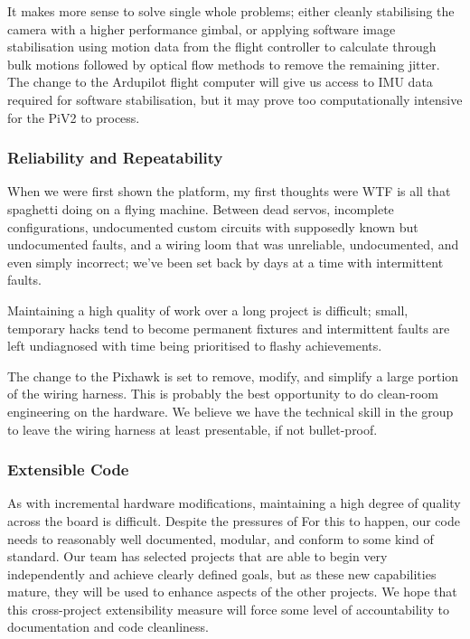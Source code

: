 \documentclass[a4paper, 11pt, titlepage]{article}
\begin{document}
      It makes more sense to solve single whole problems; either cleanly stabilising the camera with a higher performance gimbal, or applying software image stabilisation using motion data from the flight controller to calculate through bulk motions followed by optical flow methods to remove the remaining jitter.
      The change to the Ardupilot flight computer will give us access to IMU data required for software stabilisation, but it may prove too computationally intensive for the PiV2 to process.


    \subsubsection{Reliability and Repeatability}
    \label{sec:Reliability}
      When we were first shown the platform, my first thoughts were WTF is all that spaghetti doing on a flying machine.
      Between dead servos, incomplete configurations, undocumented custom circuits with supposedly known but undocumented faults, and a wiring loom that was unreliable, undocumented, and even simply incorrect;  we've been set back by days at a time with intermittent faults.

      Maintaining a high quality of work over a long project is difficult; small, temporary hacks tend to become permanent fixtures and intermittent faults are left undiagnosed with time being prioritised to flashy achievements.

      The change to the Pixhawk is set to remove, modify, and simplify a large portion of the wiring harness.  This is probably the best opportunity to do clean-room engineering on the hardware.  We believe we have the technical skill in the group to leave the wiring harness at least presentable, if not bullet-proof.


    \subsubsection{Extensible Code}
      As with incremental hardware modifications, maintaining a high degree of quality across the board is difficult.  Despite the pressures of 
      For this to happen, our code needs to reasonably well documented, modular, and conform to some kind of standard. 
      Our team has selected projects that are able to begin very independently and achieve clearly defined goals, but as these new capabilities mature, they will be used to enhance aspects of the other projects.  We hope that this cross-project extensibility measure will force some level of accountability to documentation and code cleanliness.
\end{document}
